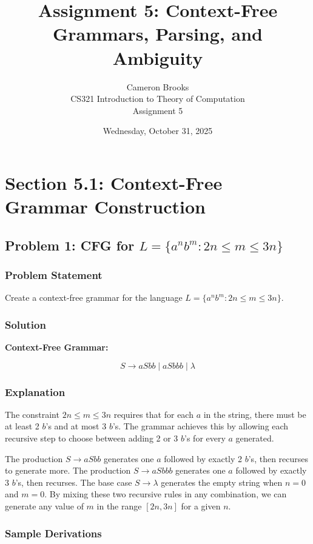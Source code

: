 \documentclass[12pt]{article}
\title{Assignment 5: Context-Free Grammars, Parsing, and Ambiguity}
\author{Cameron Brooks \\
        CS321 Introduction to Theory of Computation \\
        Assignment 5}
\date{Wednesday, October 31, 2025}
\begin{document}
\maketitle
\thispagestyle{empty}

\newpage
\tableofcontents
\newpage

\section{Section 5.1: Context-Free Grammar Construction}

\subsection{Problem 1: CFG for $L = \{a^n b^m : 2n \le m \le 3n\}$}

\subsubsection{Problem Statement}
Create a context-free grammar for the language $L = \{a^n b^m : 2n \le m \le 3n\}$.

\subsubsection{Solution}

\textbf{Context-Free Grammar:}

$$S \rightarrow aSbb \mid aSbbb \mid \lambda$$

\subsubsection{Explanation}

The constraint $2n \le m \le 3n$ requires that for each $a$ in the string, there must be at least 2 $b$'s and at most 3 $b$'s. The grammar achieves this by allowing each recursive step to choose between adding 2 or 3 $b$'s for every $a$ generated.

The production $S \rightarrow aSbb$ generates one $a$ followed by exactly 2 $b$'s, then recurses to generate more. The production $S \rightarrow aSbbb$ generates one $a$ followed by exactly 3 $b$'s, then recurses. The base case $S \rightarrow \lambda$ generates the empty string when $n=0$ and $m=0$. By mixing these two recursive rules in any combination, we can generate any value of $m$ in the range $[2n, 3n]$ for a given $n$.

\subsubsection{Sample Derivations}
\end{document}
